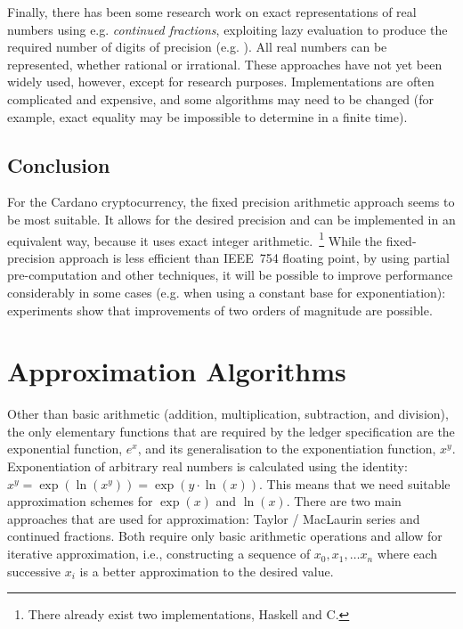 \documentclass[11pt,a4paper,dvipsnames,twosided]{article}
\theoremstyle{definition}
\theoremstyle{definition}
\begin{document}
Finally, there has been some research work on exact representations of real
numbers using e.g. \emph{continued fractions}, exploiting lazy evaluation to
produce the required number of digits of precision
(e.g. \cite{DBLP:journals/tcs/Escardo96}).  All real numbers can be represented,
whether rational or irrational.  These approaches have not yet been widely used,
however, except for research purposes.  Implementations are often complicated
and expensive, and some algorithms may need to be changed (for example, exact
equality may be impossible to determine in a finite time).

\subsection{Conclusion}
\label{sec:summary}

For the Cardano cryptocurrency, the fixed precision arithmetic approach
seems to be most suitable. It allows for the desired precision and can be
implemented in an equivalent way, because it uses exact integer
arithmetic.~\footnote{There already exist two implementations, Haskell and C.}
While the fixed-precision approach is less efficient than IEEE~754 floating point,
by using partial pre-computation and other techniques, it will be possible to improve performance considerably in
some cases (e.g. when using a constant base for exponentiation): experiments show that improvements
of two orders of magnitude are possible.

\section{Approximation Algorithms}
\label{sec:algorithms}

Other than basic arithmetic (addition, multiplication, subtraction, and
division), the only elementary functions that are required by the ledger
specification are the exponential function, $e^{x}$, and its generalisation to
the exponentiation function, $x^{y}$. Exponentiation of arbitrary real numbers
is calculated using the identity:
$x^{y}= \exp({\ln(x^{y})}) = \exp(y\cdot \ln(x))$. This means that we need
suitable approximation schemes for $\exp(x)$ and $\ln(x)$.
%
There are two main approaches that are used for approximation: Taylor / MacLaurin series and
continued fractions. Both require only basic arithmetic operations and allow for
iterative approximation, i.e., constructing a sequence of $x_{0},x_{1},\ldots
x_{n}$ where each successive $x_{i}$ is a better
approximation to the desired value.
\end{document}
